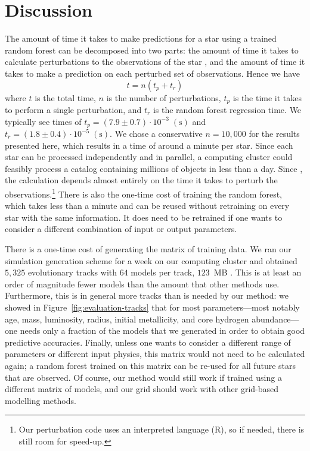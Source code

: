 \section{Discussion}
The amount of time it takes to make predictions for a star using a trained random forest can be decomposed into two parts: the amount of time it takes to calculate perturbations to the observations of the star , and the amount of time it takes to make a prediction on each perturbed set of observations. Hence we have
\begin{equation}
    t = n(t_p + t_r)
\end{equation}
where $t$ is the total time, $n$ is the number of perturbations, $t_p$ is the time it takes to perform a single perturbation, and $t_r$ is the random forest regression time. We typically see times of ${t_p = (7.9 \pm 0.7) \cdot 10^{-3} \; (\si{\s})}$ and ${t_r = (1.8 \pm 0.4) \cdot 10^{-5} \; (\si{\s})}$. We chose a conservative ${n=10,000}$ for the results presented here, which results in a time of around a minute per star. Since each star can be processed independently and in parallel, a computing cluster could feasibly process a catalog containing millions of objects in less than a day. Since , the calculation depends almost entirely on the time it takes to perturb the observations.\footnote{Our perturbation code uses an interpreted language (R), so if needed, there is still room for speed-up.} There is also the one-time cost of training the random forest, which takes less than a minute and can be reused without retraining on every star with the same information. It does need to be retrained if one wants to consider a different combination of input or output parameters. 

There is a one-time cost of generating the matrix of training data. We ran our simulation generation scheme for a week on our computing cluster and obtained $5,325$ evolutionary tracks with $64$ models per track,  $123$~MB . This is at least an order of magnitude fewer models than the amount that other methods use. Furthermore, this is in general more tracks than is needed by our method: we showed in Figure~\ref{fig:evaluation-tracks} that for most parameters---most notably age, mass, luminosity, radius, initial metallicity, and core hydrogen abundance---one needs only a fraction of the models that we generated in order to obtain good predictive accuracies. Finally, unless one wants to consider a different range of parameters or different input physics, this matrix would not need to be calculated again; a random forest trained on this matrix can be re-used for all future stars that are observed. Of course, our method would still work if trained using a different matrix of models, and our grid should work with other grid-based modelling methods. 


